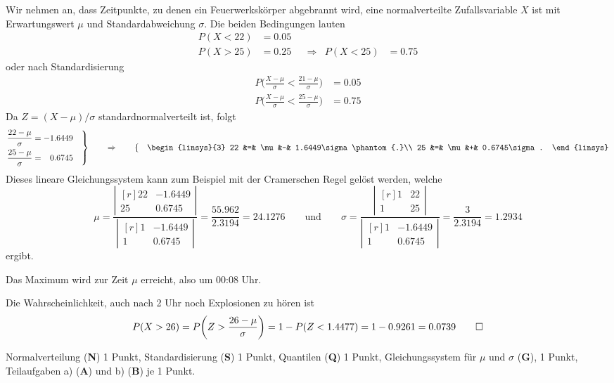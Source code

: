 \begin{loesung}
Wir nehmen an, dass Zeitpunkte, zu denen ein Feuerwerkskörper 
abgebrannt wird, eine normalverteilte Zufallsvariable $X$
ist mit Erwartungswert $\mu$ und Standardabweichung $\sigma$.
Die beiden Bedingungen lauten
\[
\begin{aligned}
P(X < 22) &= 0.05 &&           &         &       \\
P(X > 25) &= 0.25 &&\Rightarrow& P(X<25) &= 0.75
\end{aligned}
\]
oder nach Standardisierung
\begin{align*}
P\biggl( \frac{X-\mu}{\sigma} < \frac{21-\mu}{\sigma} \biggr) &= 0.05 \\
P\biggl( \frac{X-\mu}{\sigma} < \frac{25-\mu}{\sigma} \biggr) &= 0.75
\end{align*}
Da $Z=(X-\mu)/\sigma$ standardnormalverteilt ist, folgt
\[
\left.
\begin{aligned}
\frac{22-\mu}{\sigma} &=          - 1.6449 \\
\frac{25-\mu}{\sigma} &= \phantom{-}0.6745
\end{aligned}
\quad
\right\}
\qquad\Rightarrow\qquad
\left\{
\quad
\begin{linsys}{3}
22 &=& \mu &-& 1.6449\sigma\phantom{.}\\
25 &=& \mu &+& 0.6745\sigma.
\end{linsys}
\right.
\]
Dieses lineare Gleichungssystem kann zum Beispiel mit der Cramerschen
Regel gelöst werden, welche
\[
\mu
=
\frac{
\left|\begin{matrix*}[r]22&-1.6449\\25&0.6745\end{matrix*}\right|
}{
\left|\begin{matrix*}[r]1&-1.6449\\1&0.6745\end{matrix*}\right|
}
=
\frac{55.962}{2.3194}
=
24.1276
\qquad\text{und}\qquad
\sigma
=
\frac{
\left|\begin{matrix*}[r]1&22\\1&25\end{matrix*}\right|
}{
\left|\begin{matrix*}[r]1&-1.6449\\1&0.6745\end{matrix*}\right|
}
=
\frac{3}{2.3194}
=
1.2934
\]
ergibt.
\begin{teilaufgaben}
\item
Das Maximum wird zur Zeit $\mu$ erreicht, also um 00:08 Uhr.
\item
Die Wahrscheinlichkeit, auch nach 2 Uhr noch Explosionen zu hören ist
\[
P(X>26) = P\biggl(Z> \frac{26-\mu}{\sigma}\biggr)
=
1-
P(Z <  1.4477) = 1 - 0.9261 = 0.0739
\qedhere
\]
\end{teilaufgaben}
\end{loesung}

\begin{bewertung}
Normalverteilung ({\bf N}) 1 Punkt,
Standardisierung ({\bf S}) 1 Punkt,
Quantilen ({\bf Q}) 1 Punkt,
Gleichungssystem für $\mu$ und $\sigma$ ({\bf G}), 1 Punkt,
Teilaufgaben a) ({\bf A}) und b) ({\bf B}) je 1 Punkt.

\end{bewertung}
